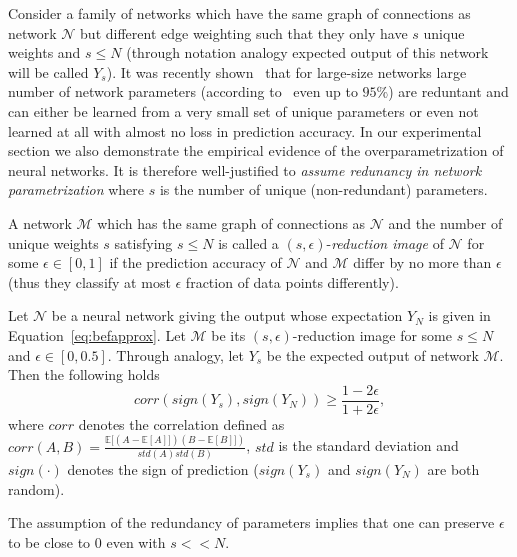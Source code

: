 \documentclass[twoside]{article}
\begin{document}
Consider a family of networks which have the same graph of connections as network $\mathcal{N}$ but different edge weighting such that they only have $s$ unique weights and $s \leq N$ (through notation analogy expected output of this network will be called $Y_s$). It was recently shown~\cite{NIPS2013_5025,DBLP:journals/corr/DentonZBLF14} that for large-size networks large number of network parameters (according to~\cite{NIPS2013_5025} even up to $95\%$) are reduntant and can either be learned from a very small set of unique parameters or even not learned at all with almost no loss in prediction accuracy.  In our experimental section we also demonstrate the empirical evidence of the overparametrization of neural networks. It is therefore well-justified to \textit{assume redunancy in network parametrization} where $s$ is the number of unique (non-redundant) parameters.

\begin{definition}
A network $\mathcal{M}$ which has the same graph of connections as $\mathcal{N}$ and the number of unique weights $s$ satisfying $s \leq N$ is called a $(s,\epsilon)$-\textit{reduction image} of $\mathcal{N}$ for some $\epsilon \in [0,1]$ if the prediction accuracy of $\mathcal{N}$ and $\mathcal{M}$ differ by no more than $\epsilon$ (thus they classify at most $\epsilon$ fraction of data points differently).
\end{definition}

\begin{theorem}
Let $\mathcal{N}$ be a neural network giving the output whose expectation $Y_N$ is given in Equation~\ref{eq:befapprox}. Let $\mathcal{M}$ be its $(s,\epsilon)$-reduction image for some $s \leq N$ and $\epsilon \in [0,0.5]$. Through analogy, let $Y_s$ be the expected output of network $\mathcal{M}$. Then the following holds
\[corr(sign(Y_s),sign(Y_N)) \geq \frac{1-2\epsilon}{1+2\epsilon},
\]
where $corr$ denotes the correlation defined as $corr(A,B) = \frac{\mathbb{E}[(A - \mathbb{E}[A]])(B - \mathbb{E}[B]])}{std(A)std(B)}$, $std$ is the standard deviation and $sign(\cdot)$ denotes the sign of prediction ($sign(Y_s)$ and $sign(Y_N)$ are both random).
\label{thm:redun}
\end{theorem}

The assumption of the redundancy of parameters implies that one can preserve $\epsilon$ to be close to $0$ even with $s << N$.
\end{document}
